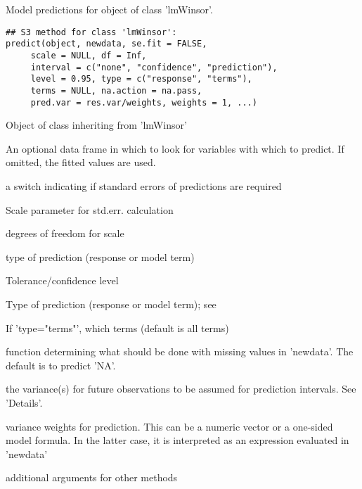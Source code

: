 \begin{Description}\relax
Model predictions for object of class 'lmWinsor'.
\end{Description}
\begin{Usage}
\begin{verbatim}
## S3 method for class 'lmWinsor':
predict(object, newdata, se.fit = FALSE,
     scale = NULL, df = Inf, 
     interval = c("none", "confidence", "prediction"),
     level = 0.95, type = c("response", "terms"), 
     terms = NULL, na.action = na.pass,
     pred.var = res.var/weights, weights = 1, ...)
\end{verbatim}
\end{Usage}
\begin{Arguments}
\begin{ldescription}
\item[\code{ object }] Object of class inheriting from 'lmWinsor'  

\item[\code{ newdata }] An optional data frame in which to look for variables with which to
predict.  If omitted, the fitted values are used. 

\item[\code{ se.fit}] a switch indicating if standard errors of predictions are required 

\item[\code{ scale }] Scale parameter for std.err. calculation  

\item[\code{df}] degrees of freedom for scale 

\item[\code{interval}] type of prediction (response or model term) 

\item[\code{ level }] Tolerance/confidence level 
\item[\code{ type }] Type of prediction (response or model term);  see

\item[\code{terms}] If 'type="terms"', which terms (default is all terms)

\item[\code{na.action}] function determining what should be done with missing values in
'newdata'.  The default is to predict 'NA'. 

\item[\code{ pred.var }] the variance(s) for future observations to be assumed for prediction
intervals.  See  'Details'.

\item[\code{ weights }] variance weights for prediction. This can be a numeric vector or a
one-sided model formula. In the latter case, it is interpreted as an
expression evaluated in 'newdata'

\item[\code{...}] additional arguments for other methods

\end{ldescription}
\end{Arguments}
